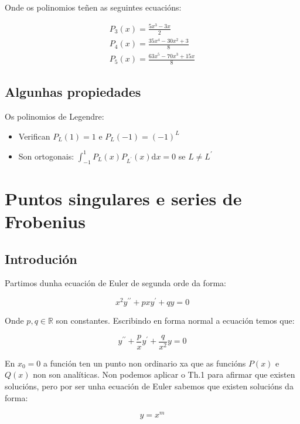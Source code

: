 \documentclass[a4paper,12pt,titlepage]{article}
\begin{document}
Onde os polinomios teñen as seguintes ecuacións:

\begin{equation*}
    \begin{gathered}
        P_3(x)= \frac{5x^3-3x}{2} \\
        P_4(x) = \frac{35x^4-30x^2+3}{8}\\
        P_5(x) = \frac{63x^5-70x^3+15x}{8}
    \end{gathered}
\end{equation*}

\subsection{Algunhas propiedades}
Os polinomios de Legendre:

\begin{itemize}
  \item Verifican $P_{L}(1)=1$ e $P_{L}(-1)=(-1)^{L}$
  \item Son ortogonais: $\int_{-1}^{1} P_{L}(x) P_{L^{\prime}}(x) \mathrm{d} x=0$ se $L \neq L^{\prime}$
\end{itemize}

\section{Puntos singulares e series de Frobenius}

\subsection{Introdución}
Partimos dunha ecuación de Euler de segunda orde da forma:

\begin{equation*}
    x^2 y^{\prime \prime}+p x y^{\prime}+q y=0
\end{equation*}

Onde $p,q \in \mathbb{R}$ son constantes. Escribindo en forma normal a ecuación temos que:

\begin{equation*}
    y^{\prime \prime}+\frac{p}{x} y^{\prime}+\frac{q}{x^{2}} y=0
\end{equation*}

En $x_0=0$ a función ten un punto non ordinario xa que as funcións $P(x)$ e $Q(x)$ non son analíticas. Non podemos aplicar o Th.1 para afirmar que existen solucións, pero por ser unha ecuación de Euler sabemos que existen solucións da forma:

\begin{equation*}
    y = x^m
\end{equation*}
\end{document}
